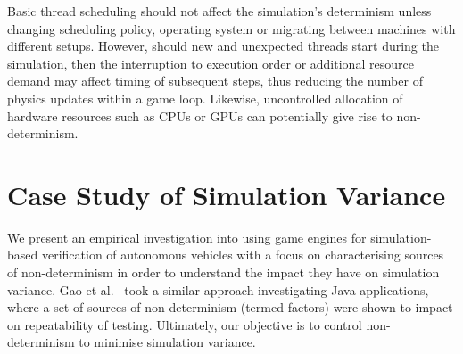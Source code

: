 \documentclass[runningheads,twocolumn,a4paper,10pt]{llncs}
\begin{document}
%
Basic thread scheduling should not affect the simulation's determinism unless changing scheduling policy, operating system or migrating between machines with different setups. 
%
However, should new and unexpected threads start during the simulation, then the interruption to execution order or additional resource demand may affect timing of subsequent steps, thus reducing the number of physics updates within a game loop. Likewise, uncontrolled allocation of hardware resources such as CPUs or GPUs can potentially give rise to non-determinism. 
%

%
%




\section{Case Study of Simulation Variance} \label{s:case-study}

We present an empirical investigation into using game engines for
simulation-based verification of autonomous vehicles with a focus on
characterising sources of non-determinism in order to understand  the impact
they have on simulation variance. 
%
%
Gao et al.~\cite{when-and-what-should-we-control} took a similar approach investigating Java applications, where a set of sources of non-determinism (termed factors) were shown to impact on repeatability of testing. %
%
Ultimately, our objective is to control non-determinism to minimise simulation variance.
\end{document}
